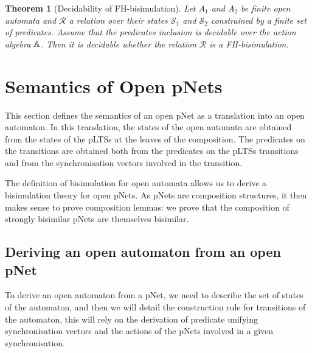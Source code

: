 \documentclass{lmcs}
\newtheorem{theorem}{Theorem}
\begin{document}
\begin{theorem}[Decidability of FH-bisimulation]
Let $A_1$ and $A_2$ be finite open automata
and $\mathcal{R}$ a relation over their states $\mathcal{S}_1$ and
$\mathcal{S}_2$ constrained by a finite set of predicates. Assume that
the predicates inclusion is decidable over  
the action algebra $\mathbb{A}$. Then it is decidable whether the relation 
$\mathcal{R}$ is a FH-bisimulation.
  
\end{theorem}



\section{Semantics of Open pNets}
\label{section:op-semantics}

This section defines the semantics of an open pNet as a translation into an open automaton. 
In this translation, the states of the open automata are obtained from
the states of the pLTSs at the leaves of the composition. The
predicates on the transitions are obtained both from the predicates on
the pLTSs transitions and from the synchronisation vectors involved in
the transition. 

The definition of bisimulation for open automata allows us to derive a
bisimulation theory for open pNets. As pNets are composition
structures, it then makes sense to prove composition lemmas: we prove
that the composition of strongly bisimilar pNets are themselves
bisimilar. 

\subsection{Deriving an open automaton from an open pNet}
To derive an open automaton from a pNet, we need to describe the set of states of the automaton, and then we will detail the construction rule for transitions of the automaton, this will rely on the derivation of predicate unifying synchronisation vectors and the actions of the pNets involved in a given synchronisation.

\end{document}
